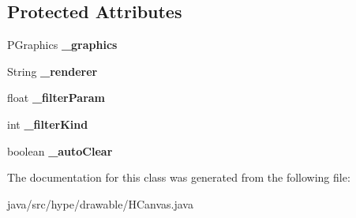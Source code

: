 \subsection*{Protected Attributes}
\begin{DoxyCompactItemize}
\item 
\hypertarget{classhype_1_1drawable_1_1_h_canvas_aa01f31017be2da64ca6c1b471948c9cc}{P\-Graphics {\bfseries \-\_\-graphics}}\label{classhype_1_1drawable_1_1_h_canvas_aa01f31017be2da64ca6c1b471948c9cc}

\item 
\hypertarget{classhype_1_1drawable_1_1_h_canvas_a02ab4098086b4c43b6b903bf1560cf08}{String {\bfseries \-\_\-renderer}}\label{classhype_1_1drawable_1_1_h_canvas_a02ab4098086b4c43b6b903bf1560cf08}

\item 
\hypertarget{classhype_1_1drawable_1_1_h_canvas_ab582bec5ae85657991f59444b4cee307}{float {\bfseries \-\_\-filter\-Param}}\label{classhype_1_1drawable_1_1_h_canvas_ab582bec5ae85657991f59444b4cee307}

\item 
\hypertarget{classhype_1_1drawable_1_1_h_canvas_af2a85848e140db5ca64232972f7eb193}{int {\bfseries \-\_\-filter\-Kind}}\label{classhype_1_1drawable_1_1_h_canvas_af2a85848e140db5ca64232972f7eb193}

\item 
\hypertarget{classhype_1_1drawable_1_1_h_canvas_aa77e165d0056b7e5b3ae4d8070fb2248}{boolean {\bfseries \-\_\-auto\-Clear}}\label{classhype_1_1drawable_1_1_h_canvas_aa77e165d0056b7e5b3ae4d8070fb2248}

\end{DoxyCompactItemize}


The documentation for this class was generated from the following file\-:\begin{DoxyCompactItemize}
\item 
java/src/hype/drawable/H\-Canvas.\-java\end{DoxyCompactItemize}

